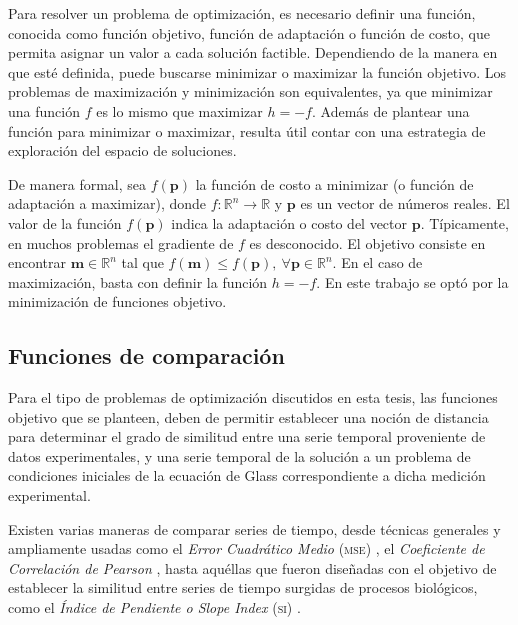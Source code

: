 Para resolver un problema de optimización, es necesario definir una función, conocida como función objetivo, función de adaptación o función de costo, que permita asignar un valor a cada solución factible. Dependiendo de la manera en que esté definida, puede buscarse minimizar o maximizar la función objetivo. Los problemas de maximización y minimización son equivalentes, ya que minimizar una función $f$ es lo mismo que maximizar $h=-f$. Además de plantear una función para minimizar o maximizar, resulta útil contar con una estrategia de exploración del espacio de soluciones. 

De manera formal, sea $f(\mathbf{p})$ la función de costo a minimizar (o función de adaptación a maximizar), donde $f:\mathbb{R}^n\rightarrow \mathbb{R}$ y $\mathbf{p}$ es un vector de números reales. El valor de la función $f(\mathbf{p})$ indica la adaptación o costo del vector $\mathbf{p}$. Típicamente, en muchos problemas el gradiente de $f$ es desconocido. El objetivo consiste en encontrar $\mathbf{m} \in \mathbb{R}^n$ tal que $f(\mathbf{m}) \le f(\mathbf{p}),\ \forall \mathbf{p} \in \mathbb{R}^n$. En el caso de maximización, basta con definir la función $h=-f$. En este trabajo se optó por la minimización de funciones objetivo.

\subsection{Funciones de comparación}\label{ch1FuncComp}

Para el tipo de problemas de optimización discutidos en esta tesis, las funciones objetivo que se planteen, deben de permitir establecer una noción de distancia para determinar el grado de similitud entre una serie temporal proveniente de datos experimentales, y una serie temporal de la solución a un problema de condiciones iniciales de la ecuación de Glass correspondiente a dicha medición experimental.

Existen varias maneras de comparar series de tiempo, desde técnicas generales y ampliamente usadas como el \emph{Error Cuadrático Medio} \textsc{(mse)} \citep{msewiki}, el \emph{Coeficiente de Correlación de Pearson} \citep{pearsoncorrwiki}, hasta aquéllas que fueron diseñadas con el objetivo de establecer la similitud entre series de tiempo surgidas de procesos biológicos, como el \emph{Índice de Pendiente o Slope Index} \textsc{(si)} \citeauthor{Cho2006} \citep{Cho2006}.%

